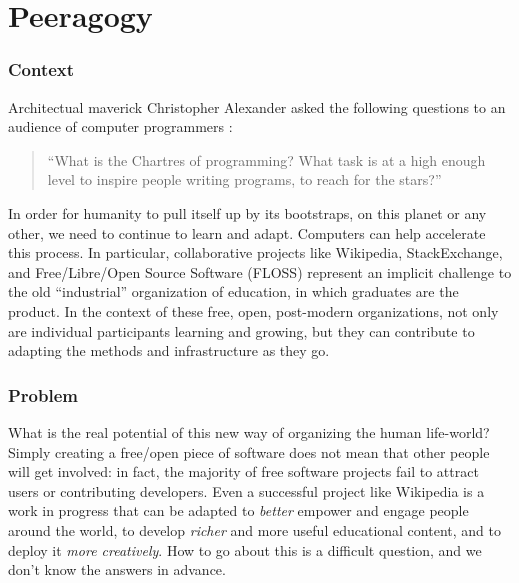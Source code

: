 \begingroup
\color{OliveGreen}

\section{Peeragogy}\label{sec:Peeragogy_Project}

\subsubsection*{Context}  Architectual maverick Christopher Alexander asked the following questions to an audience of computer programmers \cite{alexander1999origins}: 
\begin{quote}
``What is the Chartres of programming? What task is at a high enough level to inspire people writing programs, to reach for the stars?''
\end{quote}
In order for humanity to pull itself up by its bootstraps, on this planet or any other, we need to continue to learn and adapt.  Computers can help accelerate this process.  In particular, collaborative projects like Wikipedia, StackExchange, and Free/Libre/Open Source Software (FLOSS) represent an implicit challenge to the old ``industrial'' organization of education, in which graduates are the product.  In the context of these free, open, post-modern organizations, not only are individual participants learning and growing, but they can contribute to adapting the methods and infrastructure as they go.

\subsubsection*{Problem} What is the real potential of this new way of organizing the human life-world?  Simply creating a free/open piece of software does not mean that other people will get involved: in fact, the majority of free software projects fail to attract users or contributing developers.  Even a successful project like Wikipedia is a work in progress that can be adapted to \emph{better} empower and engage people around the world, to develop \emph{richer} and more useful educational content, and to deploy it \emph{more creatively}.  How to go about this is a difficult question, and we don't know the answers in advance.


